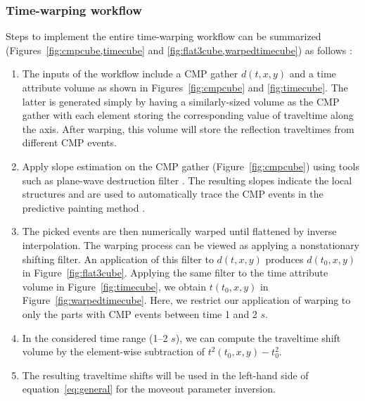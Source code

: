 \subsubsection{Time-warping workflow}
Steps to implement the entire time-warping workflow can be summarized (Figures~\ref{fig:cmpcube,timecube} and \ref{fig:flat3cube,warpedtimecube}) as follows \cite[]{will}:
\begin{enumerate}
    \item The inputs of the workflow include a CMP gather $d(t,x,y)$ and a time attribute volume as shown in Figures~\ref{fig:cmpcube} and \ref{fig:timecube}. The latter is generated simply by having a similarly-sized volume as the CMP gather with each element storing the corresponding value of traveltime along the axis. After warping, this volume will store the reflection traveltimes from different CMP events.
    
    \item Apply slope estimation on the CMP gather (Figure~\ref{fig:cmpcube}) using tools such as plane-wave destruction filter \cite[]{fomelpwd}. The resulting slopes indicate the local structures and are used to automatically trace the CMP events in the predictive painting method \cite[]{fomelpredict}.
    
    \item The picked events are then numerically warped until flattened by inverse interpolation. The warping process can be viewed as applying a nonstationary shifting filter. An application of this filter to $d(t,x,y)$ produces $d(t_0,x,y)$ in Figure~\ref{fig:flat3cube}. Applying the same filter to the time attribute volume in Figure~\ref{fig:timecube}, we obtain $t(t_0,x,y)$ in Figure~\ref{fig:warpedtimecube}. Here, we restrict our application of warping to only the parts with CMP events between time 1 and 2 $s$.
    
    \item In the considered time range (1--2 $s$), we can compute the traveltime shift volume by the element-wise subtraction of $t^2(t_0,x,y)-t_0^2$. 
    
    \item The resulting traveltime shifts will be used in the left-hand side of equation~\ref{eq:general} for the moveout parameter inversion.
\end{enumerate}


